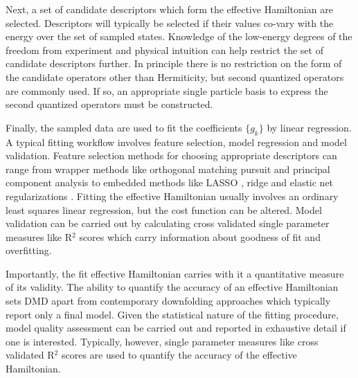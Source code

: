 \documentclass[12pt]{article}
\begin{document}
Next, a set of candidate descriptors which form the effective Hamiltonian are selected.
Descriptors will typically be selected if their values co-vary with the energy over the set of sampled states. 
Knowledge of the low-energy degrees of the freedom from experiment and physical intuition can help restrict the set of candidate descriptors further.
In principle there is no restriction on the form of the candidate operators other than Hermiticity, but second quantized operators are commonly used.
If so, an appropriate single particle basis to express the second quantized operators must be constructed.

Finally, the sampled data are used to fit the coefficients $\{g_k\}$ by linear regression.
A typical fitting workflow involves feature selection, model regression and model validation.
Feature selection methods for choosing appropriate descriptors can range from wrapper methods like orthogonal matching pursuit \cite{Cai2011} and principal component analysis \cite{pearson_karl_1901_1430636} to embedded methods like LASSO \cite{10.2307/2346178}, ridge \cite{doi:10.1137/S0895479897326432} and elastic net regularizations \cite{Zou05regularizationand}. 
Fitting the effective Hamiltonian usually involves an ordinary least squares linear regression, but the cost function can be altered.
Model validation can be carried out by calculating cross validated single parameter measures like R$^2$ scores which carry information about goodness of fit and overfitting.

Importantly, the fit effective Hamiltonian carries with it a quantitative measure of its validity.
The ability to quantify the accuracy of an effective Hamiltonian sets DMD apart from contemporary downfolding approaches which typically report only a final model.
Given the statistical nature of the fitting procedure, model quality assessment can be carried out and reported in exhaustive detail if one is interested.
Typically, however, single parameter measures like cross validated R$^2$ scores are used to quantify the accuracy of the effective Hamiltonian.
\end{document}
